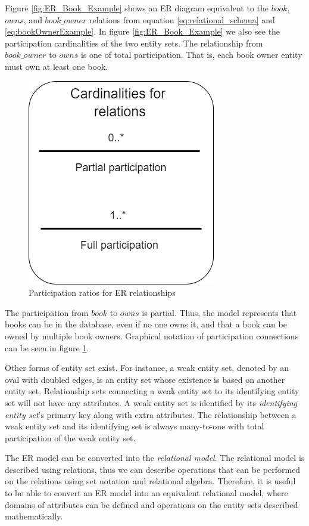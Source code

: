 Figure \ref{fig:ER_Book_Example} shows an ER diagram equivalent to the $book$, $owns$, and $book\_owner$ relations from equation \ref{eq:relational_schema} and \ref{eq:bookOwnerExample}.
In figure \ref{fig:ER_Book_Example} we also see the participation cardinalities of the two entity sets. 
The relationship from $book\_owner$ to $owns$ is one of total participation. That is, each book owner entity must own at least one book.
\begin{figure}[h]
    \centering
    \includegraphics[scale=0.5]{Images/cardinalities.png}
    \caption{Participation ratios for ER relationships}
    \label{fig:ERDiagram_Cardinality}
\end{figure}
The participation from $book$ to $owns$ is partial. 
Thus, the model represents that books can be in the database, even if no one owns it, and that a book can be owned by multiple book owners.
Graphical notation of participation connections can be seen in figure \ref{fig:ERDiagram_Cardinality}.


Other forms of entity set exist. For instance, a weak entity set, denoted by an oval with doubled edges, is an entity set whose existence is based on another entity set. 
Relationship sets connecting a weak entity set to its identifying entity set will not have any attributes\cite{DBSBook}.
A weak entity set is identified by its \textit{identifying entity set}'s primary key along with extra attributes. 
The relationship between a weak entity set and its identifying set is always many-to-one with total participation of the weak entity set.

The ER model can be converted into the \textit{relational model}. The relational model is described using relations, thus we can describe operations that can be performed on the relations using set notation and relational algebra. 
Therefore, it is useful to be able to convert an ER model into an equivalent relational model, where domains of attributes can be defined and operations on the entity sets described mathematically.

